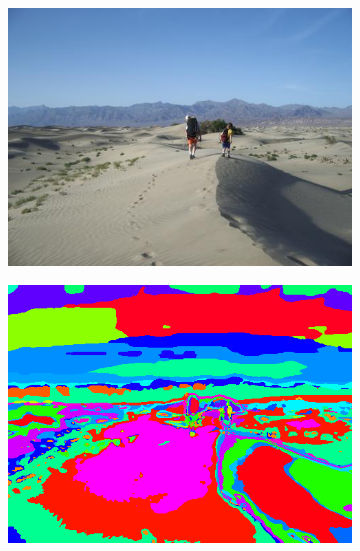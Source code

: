 \documentclass[11pt]{article}
\begin{document}
\begin{figure}[h!]
  \center
  \begin{subfigure}{0.45\linewidth}
    \centering
    \includegraphics[width=\textwidth]{../results/sun_bqxjwczwiwnzkrbj_image.png}
  \end{subfigure}
  \begin{subfigure}{0.45\linewidth}
    \centering
    \includegraphics[width=\textwidth]{../results/sun_bqxjwczwiwnzkrbj_wordmap.png}
  \end{subfigure}


\end{figure}
\end{document}
